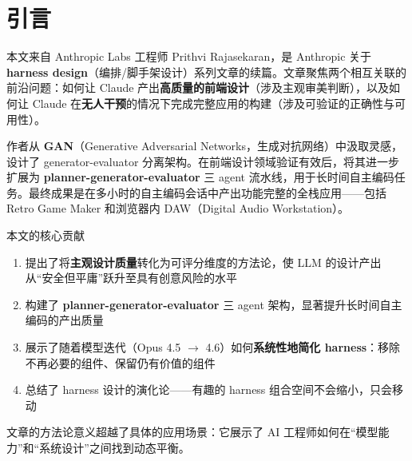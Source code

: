 \section{引言}

本文来自 Anthropic Labs 工程师 Prithvi Rajasekaran，是 Anthropic 关于 \textbf{harness design}（编排/脚手架设计）系列文章的续篇。文章聚焦两个相互关联的前沿问题：如何让 Claude 产出\textbf{高质量的前端设计}（涉及主观审美判断），以及如何让 Claude 在\textbf{无人干预}的情况下完成完整应用的构建（涉及可验证的正确性与可用性）。

作者从 \textbf{GAN}（Generative Adversarial Networks，生成对抗网络）中汲取灵感，设计了 generator-evaluator 分离架构。在前端设计领域验证有效后，将其进一步扩展为 \textbf{planner-generator-evaluator} 三 agent 流水线，用于长时间自主编码任务。最终成果是在多小时的自主编码会话中产出功能完整的全栈应用——包括 Retro Game Maker 和浏览器内 DAW（Digital Audio Workstation）。

\begin{importantbox}{本文的核心贡献}
\begin{enumerate}[leftmargin=1.5em]
    \item 提出了将\textbf{主观设计质量}转化为可评分维度的方法论，使 LLM 的设计产出从``安全但平庸''跃升至具有创意风险的水平
    \item 构建了 \textbf{planner-generator-evaluator} 三 agent 架构，显著提升长时间自主编码的产出质量
    \item 展示了随着模型迭代（Opus 4.5 $\to$ 4.6）如何\textbf{系统性地简化 harness}：移除不再必要的组件、保留仍有价值的组件
    \item 总结了 harness 设计的演化论——有趣的 harness 组合空间不会缩小，只会移动
\end{enumerate}
\end{importantbox}

文章的方法论意义超越了具体的应用场景：它展示了 AI 工程师如何在``模型能力''和``系统设计''之间找到动态平衡。



